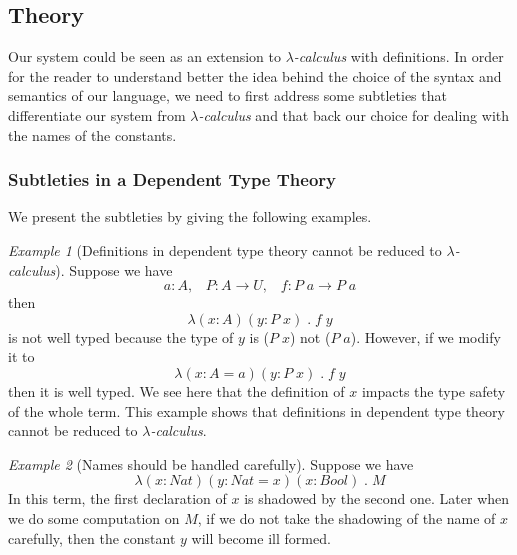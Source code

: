 \documentclass{article}
\theoremstyle{remark}
\newtheorem{example}{Example}[section]
\begin{document}
\subsection{Theory}
Our system could be seen as an extension to \emph{$\lambda$-calculus} with definitions. In order for the reader to understand better the idea behind the choice of the syntax and semantics of our language, we need to first address some subtleties that differentiate our system from \emph{$\lambda$-calculus} and that back our choice for dealing with the names of the constants.

\subsubsection{Subtleties in a Dependent Type Theory}
We present the subtleties by giving the following examples. 

\begin{example}[Definitions in dependent type theory cannot be reduced to \emph{$\lambda$-calculus}] \label{exa1}
  Suppose we have
  \[ a : A, \;\;\; P : A \to U, \;\;\; f : P \; a \to P \; a \]
  then
  \[ \lambda (x : A) (y : P \; x) \; . \; f \; y \]
  is not well typed because the type of $y$ is ($P \; x$) not ($P \; a$). However, if we modify it to
  \[ \lambda (x : A = a) (y : P \; x) \; . \; f \; y \]
  then it is well typed. We see here that the definition of $x$ impacts the type safety of the whole term. This example shows that definitions in dependent type theory cannot be reduced to \emph{$\lambda$-calculus}.
\end{example}

\begin{example}[Names should be handled carefully] \label{exa2}
  Suppose we have
  \[ \lambda (x : Nat) (y : Nat = x) (x : Bool) \; . \; M \]
  In this term, the first declaration of $x$ is shadowed by the second one. Later when we do some computation on $M$, if we do not take the shadowing of the name of $x$ carefully, then the constant $y$ will become ill formed.
\end{example}
\end{document}
